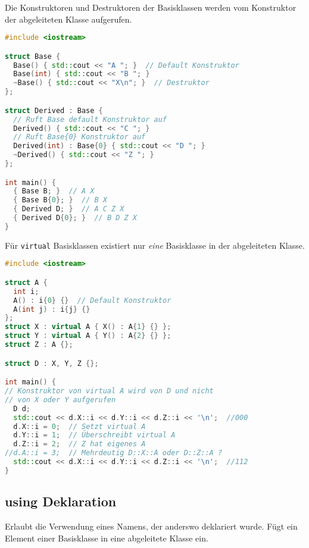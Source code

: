 Die Konstruktoren und Destruktoren der Basisklassen werden vom Konstruktor der
abgeleiteten Klasse aufgerufen.

\begin{lstlisting}[language=C++]
#include <iostream>

struct Base {
  Base() { std::cout << "A "; }  // Default Konstruktor
  Base(int) { std::cout << "B "; }
  ~Base() { std::cout << "X\n"; }  // Destruktor
};

struct Derived : Base {
  // Ruft Base default Konstruktor auf
  Derived() { std::cout << "C "; }
  // Ruft Base{0} Konstruktor auf
  Derived(int) : Base{0} { std::cout << "D "; }
  ~Derived() { std::cout << "Z "; }
};

int main() {
  { Base B; }  // A X
  { Base B{0}; }  // B X
  { Derived D; }  // A C Z X
  { Derived D{0}; }  // B D Z X
}
\end{lstlisting}

Für \lstinline|virtual| Basisklassen existiert nur \emph{eine} Basisklasse in
der abgeleiteten Klasse.

\begin{lstlisting}[language=C++]
#include <iostream>

struct A {
  int i;
  A() : i{0} {}  // Default Konstruktor
  A(int j) : i{j} {}
};
struct X : virtual A { X() : A{1} {} };
struct Y : virtual A { Y() : A{2} {} };
struct Z : A {};

struct D : X, Y, Z {};

int main() {
// Konstruktor von virtual A wird von D und nicht
// von X oder Y aufgerufen
  D d;
  std::cout << d.X::i << d.Y::i << d.Z::i << '\n';  //000
  d.X::i = 0;  // Setzt virtual A
  d.Y::i = 1;  // Überschreibt virtual A
  d.Z::i = 2;  // Z hat eigenes A
//d.A::i = 3;  // Mehrdeutig D::X::A oder D::Z::A ?
  std::cout << d.X::i << d.Y::i << d.Z::i << '\n';  //112
}
\end{lstlisting}

\subsection{using Deklaration}

Erlaubt die Verwendung eines Namens, der anderswo deklariert wurde. Fügt ein
Element einer Basisklasse in eine abgeleitete Klasse ein.

